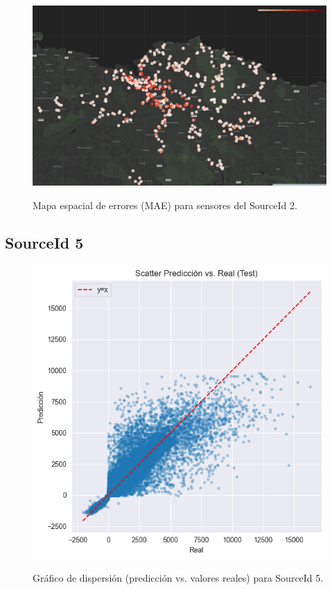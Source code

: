 \begin{figure}[H]
	\centering
	\caption{Mapa espacial de errores (MAE) para sensores del SourceId 2.}
	\includegraphics[width=0.9\linewidth]{includes/cap5/graphs/advanced/sid2_meters_error_rate_map.png}
	\label{fig:sid2_error_map}
\end{figure}

\subsection*{SourceId 5}

\begin{figure}[H]
	\centering
	\caption{Gráfico de dispersión (predicción vs. valores reales) para SourceId 5.}
	\includegraphics[width=0.75\linewidth]{includes/cap5/graphs/advanced/sid5_scatter_predicted_vs_actual.png}
	\label{fig:sid5_scatter}
\end{figure}

